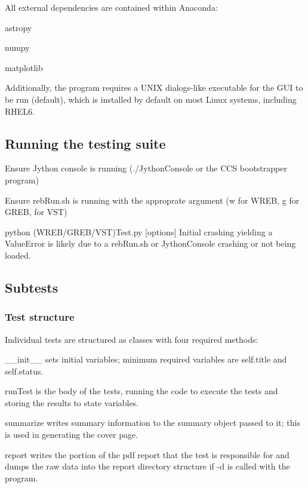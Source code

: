 All external dependencies are contained within Anaconda\+:
\begin{DoxyItemize}
\item astropy
\item numpy
\item matplotlib
\end{DoxyItemize}

Additionally, the program requires a U\+N\+IX dialogs-\/like executable for the G\+UI to be run (default), which is installed by default on most Linux systems, including R\+H\+E\+L6.

\subsection*{Running the testing suite}


\begin{DoxyItemize}
\item Ensure Jython console is running (./\+Jython\+Console or the C\+CS bootstrapper program)
\item Ensure {\ttfamily reb\+Run.\+sh} is running with the approprate argument ({\ttfamily w} for W\+R\+EB, {\ttfamily g} for G\+R\+EB, {} for V\+ST)
\item {\ttfamily python (W\+R\+E\+B/\+G\+R\+E\+B/\+V\+ST)Test.\+py \mbox{[}options\mbox{]}} Initial crashing yielding a {\ttfamily Value\+Error} is likely due to a {\ttfamily reb\+Run.\+sh} or {\ttfamily Jython\+Console} crashing or not being loaded.
\end{DoxyItemize}

\subsection*{Subtests}

\subsubsection*{Test structure}

Individual tests are structured as classes with four required methods\+:
\begin{DoxyItemize}
\item {\ttfamily \+\_\+\+\_\+init\+\_\+\+\_\+} sets initial variables; minimum required variables are {\ttfamily self.\+title} and {\ttfamily self.\+status}.
\item {\ttfamily run\+Test} is the body of the tests, running the code to execute the tests and storing the results to state variables.
\item {\ttfamily summarize} writes summary information to the summary object passed to it; this is used in generating the cover page.
\item {\ttfamily report} writes the portion of the pdf report that the test is responsible for and dumps the raw data into the report directory structure if {\ttfamily -\/d} is called with the program.
\end{DoxyItemize}

